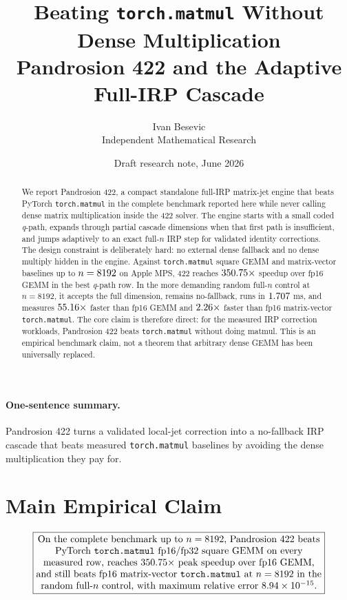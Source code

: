 \documentclass[11pt]{article}
\title{\textbf{Beating \texttt{torch.matmul} Without Dense Multiplication}\\[-1mm]
\large Pandrosion 422 and the Adaptive Full-IRP Cascade}
\author{Ivan Besevic\\Independent Mathematical Research}
\date{Draft research note, June 2026}
\newcommand{\qpath}{\textit{q}\nobreakdash-path}
\newcommand{\matmul}{\texttt{torch.matmul}}
\begin{document}
\maketitle

\begin{abstract}
We report Pandrosion 422, a compact standalone full-IRP matrix-jet engine that
beats PyTorch \matmul{} in the complete benchmark reported here while never
calling dense matrix multiplication inside the 422 solver.  The engine starts
with a small coded \qpath, expands through partial cascade dimensions when that
first path is insufficient, and jumps adaptively to an exact full-\(n\) IRP
step for validated identity corrections.  The design constraint is deliberately
hard: no external dense fallback and no dense multiply hidden in the engine.
Against \matmul{} square GEMM and matrix-vector baselines up to
\(n=8192\) on Apple MPS, 422 reaches \(350.75\times\)
speedup over fp16 GEMM in the best \qpath{} row.  In the more demanding random
full-\(n\) control at \(n=8192\), it accepts the full dimension, remains
no-fallback, runs in \(1.707\) ms, and measures
\(55.16\times\) faster than fp16 GEMM and
\(2.26\times\) faster than fp16 matrix-vector
\matmul{}.  The core claim is therefore direct: for the measured IRP correction
workloads, Pandrosion 422 beats \matmul{} without doing matmul.  This is an
empirical benchmark claim, not a theorem that arbitrary dense GEMM has been
universally replaced.
\end{abstract}

\paragraph{One-sentence summary.}
Pandrosion 422 turns a validated local-jet correction into a no-fallback IRP
cascade that beats measured \matmul{} baselines by avoiding the dense
multiplication they pay for.

\section*{Main Empirical Claim}

\[
\boxed{
\begin{minipage}{0.86\linewidth}
\centering
On the complete benchmark up to \(n=\MaxDimension\), Pandrosion 422 beats
PyTorch \matmul{} fp16/fp32 square GEMM on every measured row, reaches
\(\BestGemmSpeedup\times\) peak speedup over fp16 GEMM, and still beats fp16
matrix-vector \matmul{} at \(n=8192\) in the random full-\(n\) control, with
maximum relative error \(\MaxRelError\).
\end{minipage}}
\]
\end{document}

